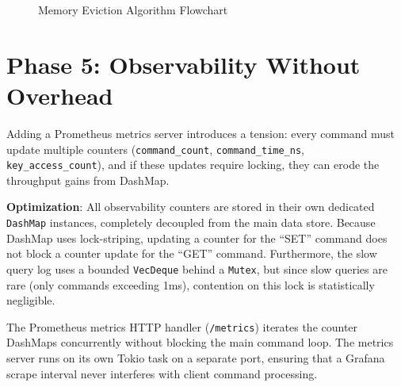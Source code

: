 \begin{figure}[htbp]
    \centering
    \caption{Memory Eviction Algorithm Flowchart}
    \label{fig:eviction_flowchart}
\end{figure}

\section{Phase 5: Observability Without Overhead}

Adding a Prometheus metrics server introduces a tension: every command must update multiple counters (\texttt{command\_count}, \texttt{command\_time\_ns}, \texttt{key\_access\_count}), and if these updates require locking, they can erode the throughput gains from DashMap.

\textbf{Optimization}: All observability counters are stored in their own dedicated \texttt{DashMap} instances, completely decoupled from the main data store. Because DashMap uses lock-striping, updating a counter for the ``SET'' command does not block a counter update for the ``GET'' command. Furthermore, the slow query log uses a bounded \texttt{VecDeque} behind a \texttt{Mutex}, but since slow queries are rare (only commands exceeding 1ms), contention on this lock is statistically negligible.

The Prometheus metrics HTTP handler (\texttt{/metrics}) iterates the counter DashMaps concurrently without blocking the main command loop. The metrics server runs on its own Tokio task on a separate port, ensuring that a Grafana scrape interval never interferes with client command processing.

